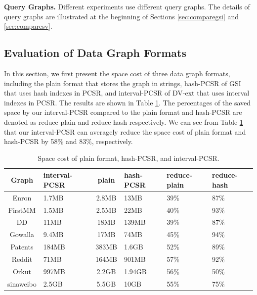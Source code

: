 \textbf{Query Graphs.} Different experiments use different query graphs. The details of query graphs are illustrated at the beginning of Sections \ref{sec:comparegsi} and \ref{sec:comparesv}.

\subsection{Evaluation of Data Graph Formats}
In this section, we first present the space cost of three data graph formats, including the plain format that stores the graph in strings, hash-PCSR of GSI that uses hash indexes in PCSR, and  interval-PCSR of DV-ext that uses interval indexes in PCSR. The results are shown in Table \ref{tab:graphsize}. The percentages of the saved space by our interval-PCSR compared to the plain format and hash-PCSR are denoted as reduce-plain and reduce-hash respectively. We can see from Table \ref{tab:graphsize} that our interval-PCSR can averagely reduce the space cost of plain format and hash-PCSR by 58\% and 83\%, respectively.
\begin{table}
\centering
  \caption{Space cost of plain format, hash-PCSR, and interval-PCSR.}
  \label{tab:graphsize}
  \begin{tabular}{cp{20pt}cp{20pt}p{20pt}p{20pt}}
  \hline
    Graph &interval-PCSR&plain&hash-PCSR&reduce-plain&reduce-hash\\
    \hline
    Enron 		&1.7MB	&2.8MB	&13MB	&39\%	&87\% \\
    FirstMM 	&1.5MB	&2.5MB	&22MB	&40\%	&93\% \\
    DD 			&11MB	&18MB	&139MB	&39\%	&87\% \\
    Gowalla 	&9.4MB	&17MB	&74MB	&45\%	&94\% \\
    Patents 	&184MB	&383MB	&1.6GB	&52\%	&89\% \\
    Reddit 		&71MB	&164MB	&901MB	&57\%	&92\% \\
    Orkut 		&997MB	&2.2GB	&1.94GB	&56\%	&50\% \\
    sinaweibo	&2.5GB	&5.5GB	&10GB	&55\%	&75\% \\

    \hline
  \end{tabular}
\end{table}

